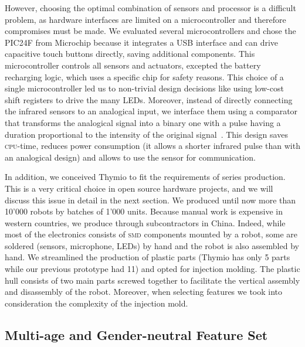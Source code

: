 \documentclass[letterpaper, 10 pt, conference]{ieeeconf}  %
\begin{document}
However, choosing the optimal combination of sensors and processor is a difficult problem, as hardware interfaces are limited on a microcontroller and therefore compromises must be made.
We evaluated several microcontrollers and chose the PIC24F from Microchip because it integrates a USB interface and can drive capacitive touch buttons directly, saving additional components. 
This microcontroller controls all sensors and actuators, excepted the battery recharging logic, which uses a specific chip for safety reasons.
This choice of a single microcontroller led us to non-trivial design decisions like using low-cost shift registers to drive the many LEDs.
Moreover, instead of directly connecting the infrared sensors to an analogical input, we interface them using a comparator that transforms the analogical signal into a binary one with a pulse having a duration proportional to the intensity of the original signal~\cite{wanda}. 
This design saves \textsc{cpu}-time, reduces power consumption (it allows a shorter infrared pulse than with an analogical design) and allows to use the sensor for communication.  

In addition, we conceived Thymio to fit the requirements of series production.
This is a very critical choice in open source hardware projects, and we will discuss this issue in detail in the next section.
We produced until now more than 10'000 robots by batches of 1'000 units.
Because manual work is expensive in western countries, we produce through subcontractors in China.
Indeed, while most of the electronics consists of \textsc{smd} components mounted by a robot, some are soldered (sensors, microphone, LEDs) by hand and the robot is also assembled by hand.
We streamlined the production of plastic parts (Thymio has only 5 parts while our previous prototype had 11) and opted for injection molding. 
The plastic hull consists of two main parts screwed together to facilitate the vertical assembly and disassembly of the robot.
Moreover, when selecting features we took into consideration the complexity of the injection mold.

\subsection{Multi-age and Gender-neutral Feature Set}
\end{document}
